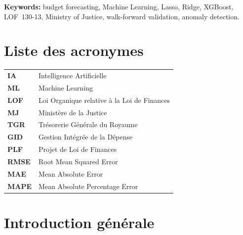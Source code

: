 \documentclass[12pt,a4paper]{article}
\begin{document}
\bigskip
\noindent\textbf{Keywords:} budget forecasting, Machine Learning, Lasso, Ridge, XGBoost, LOF~130-13, Ministry of Justice, walk-forward validation, anomaly detection.

\newpage

{}
\listoffigures

\newpage

{}
\listoftables

\newpage

\section*{Liste des acronymes}

\begin{tabular}{@{}ll@{}}
\textbf{IA}   & Intelligence Artificielle \\
\textbf{ML}   & Machine Learning \\
\textbf{LOF}  & Loi Organique relative \`a la Loi de Finances \\
\textbf{MJ}   & Minist\`ere de la Justice \\
\textbf{TGR}  & Tr\'esorerie G\'en\'erale du Royaume \\
\textbf{GID}  & Gestion Int\'egr\'ee de la D\'epense \\
\textbf{PLF}  & Projet de Loi de Finances \\
\textbf{RMSE} & Root Mean Squared Error \\
\textbf{MAE}  & Mean Absolute Error \\
\textbf{MAPE} & Mean Absolute Percentage Error \\
\end{tabular}

\newpage

\section*{Introduction g\'en\'erale}
\end{document}
